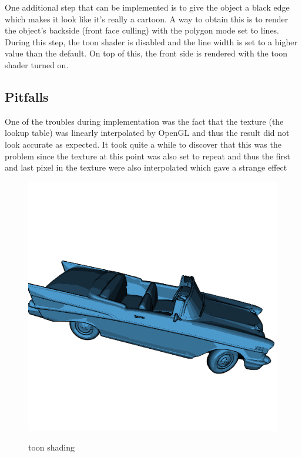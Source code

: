 \documentclass[a4paper,12pt]{article}
\begin{document}
One additional step that can be implemented is to give the object a black edge which makes it look like it's really a cartoon. A way to obtain this is to render the object's backside (front face culling) with the polygon mode set to lines. During this step, the toon shader is disabled and the line width is set to a higher value than the default. On top of this, the front side is rendered with the toon shader turned on.

\subsection{Pitfalls}
\label{sec:PitfallsToonShader}

One of the troubles during implementation was the fact that the texture (the lookup table) was linearly interpolated by OpenGL and thus the result did not look accurate as expected. It took quite a while to discover that this was the problem since the texture at this point was also set to repeat and thus the first and last pixel in the texture were also interpolated which gave a strange effect


\begin{figure}[htbp]
  \begin{center}
		\scalebox{0.3} {\includegraphics[width=512px]{images/toon.png}}
    \caption{toon shading}
    \label{fig:toonShading}
  \end{center}
\end{figure}
\end{document}
